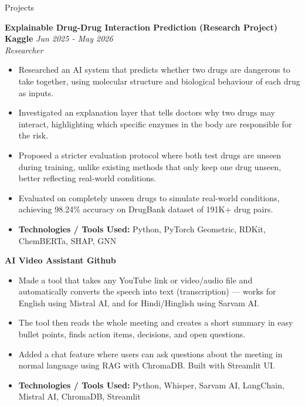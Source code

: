 \documentclass{resume}
\begin{document}
\begin{rSection}{Projects}

{\bf Explainable Drug-Drug Interaction Prediction (Research Project) \textbar{} Kaggle} \hfill {\em Jun 2025 - May 2026} \\
{\em Researcher}
\begin{itemize}
    \vspace{-0.2cm}\item Researched an AI system that predicts whether two drugs are dangerous to take together, using molecular structure and biological behaviour of each drug as inputs.
    \vspace{-0.25cm}\item Investigated an explanation layer that tells doctors why two drugs may interact, highlighting which specific enzymes in the body are responsible for the risk.
    \vspace{-0.25cm}\item Proposed a stricter evaluation protocol where both test drugs are unseen during training, unlike existing methods that only keep one drug unseen, better reflecting real-world conditions.
    \vspace{-0.25cm}\item Evaluated on completely unseen drugs to simulate real-world conditions, achieving 98.24\% accuracy on DrugBank dataset of 191K+ drug pairs.
    \vspace{-0.25cm}\item {\bf Technologies / Tools Used:} Python, PyTorch Geometric, RDKit, ChemBERTa, SHAP, GNN
\end{itemize}

\vspace{0.15cm}
{\bf AI Video Assistant \textbar{} Github}
\begin{itemize}
    \vspace{-0.2cm}\item Made a tool that takes any YouTube link or video/audio file and automatically converts the speech into text (transcription) --- works for English using Mistral AI, and for Hindi/Hinglish using Sarvam AI.
    \vspace{-0.25cm}\item The tool then reads the whole meeting and creates a short summary in easy bullet points, finds action items, decisions, and open questions.
    \vspace{-0.25cm}\item Added a chat feature where users can ask questions about the meeting in normal language using RAG with ChromaDB. Built with Streamlit UI.
    \vspace{-0.25cm}\item {\bf Technologies / Tools Used:} Python, Whisper, Sarvam AI, LangChain, Mistral AI, ChromaDB, Streamlit
\end{itemize}


\end{rSection}
\end{document}
